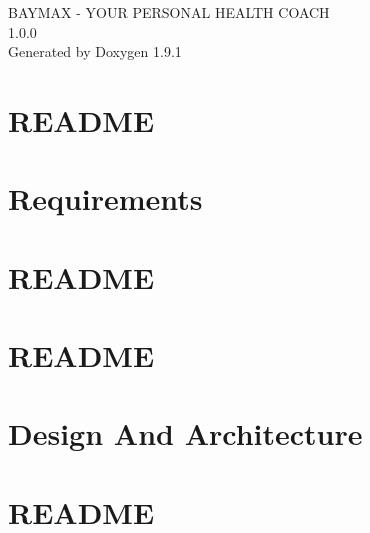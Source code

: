 \let\mypdfximage\pdfximage\def\pdfximage{\immediate\mypdfximage}\documentclass[twoside]{book}
\newcommand{\+}{\discretionary{\mbox{\scriptsize$\hookleftarrow$}}{}{}}
\newcommand{\clearemptydoublepage}{%
  \newpage{\pagestyle{empty}\cleardoublepage}%
}
\begin{document}
\raggedbottom

\begin{titlepage}
\vspace*{7cm}
\begin{center}%
{\Large BAYMAX -\/ YOUR PERSONAL HEALTH COACH \\[1ex]\large 1.\+0.\+0 }\\
\vspace*{1cm}
{\large Generated by Doxygen 1.9.1}\\
\end{center}
\end{titlepage}
\clearemptydoublepage
{}
\tableofcontents
\clearemptydoublepage
{}

\chapter{README}
\label{md_1__requirements__excel_files__r_e_a_d_m_e}

\chapter{Requirements}
\label{md_1__requirements__r_e_a_d_m_e}

\chapter{README}
\label{md_2__design_and__architecture__behavioural__u_m_l__diagram__activity__u_m_l__diagram__r_e_a_d_m_e}

\chapter{README}
\label{md_2__design_and__architecture__behavioural__u_m_l__diagram__use__case__u_m_l__diagram__r_e_a_d_m_e}

\chapter{Design And Architecture}
\label{md_2__design_and__architecture__r_e_a_d_m_e}

\chapter{README}
\label{md_2__design_and__architecture__structural__u_m_l__diagram__r_e_a_d_m_e}

\end{document}

